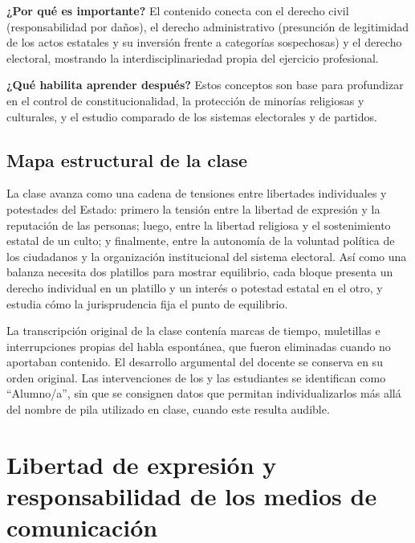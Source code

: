 \documentclass[12pt,oneside]{book}
\begin{document}
\textbf{¿Por qué es importante?} El contenido conecta con el derecho civil (responsabilidad por daños), el derecho administrativo (presunción de legitimidad de los actos estatales y su inversión frente a categorías sospechosas) y el derecho electoral, mostrando la interdisciplinariedad propia del ejercicio profesional.

\textbf{¿Qué habilita aprender después?} Estos conceptos son base para profundizar en el control de constitucionalidad, la protección de minorías religiosas y culturales, y el estudio comparado de los sistemas electorales y de partidos.

\section*{Mapa estructural de la clase}

La clase avanza como una cadena de tensiones entre libertades individuales y potestades del Estado: primero la tensión entre la libertad de expresión y la reputación de las personas; luego, entre la libertad religiosa y el sostenimiento estatal de un culto; y finalmente, entre la autonomía de la voluntad política de los ciudadanos y la organización institucional del sistema electoral. Así como una balanza necesita dos platillos para mostrar equilibrio, cada bloque presenta un derecho individual en un platillo y un interés o potestad estatal en el otro, y estudia cómo la jurisprudencia fija el punto de equilibrio.

\begin{note}
La transcripción original de la clase contenía marcas de tiempo, muletillas e interrupciones propias del habla espontánea, que fueron eliminadas cuando no aportaban contenido. El desarrollo argumental del docente se conserva en su orden original. Las intervenciones de los y las estudiantes se identifican como ``Alumno/a'', sin que se consignen datos que permitan individualizarlos más allá del nombre de pila utilizado en clase, cuando este resulta audible.
\end{note}

\chapter[Libertad de expresión y responsabilidad de los medios]{Libertad de expresión y responsabilidad de los medios de comunicación}
\end{document}

